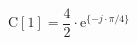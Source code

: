 \begin{center}
\[
\textrm{C}[1] = \frac{4}{2} \cdot \textrm{e}^{\{ -j \cdot \pi/4 \}}
\]
\end{center}

